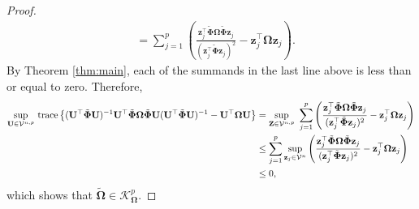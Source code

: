 \documentclass[12pt]{article}
\newcommand{\tr}{\text{\rm trace}}
\newcommand{\bl}[1]{{\mathbf #1}}
\newcommand{\bs}[1]{\boldsymbol #1}
\begin{document}
\begin{proof}
\begin{equation*}
\begin{aligned}
    &= \sum_{j=1}^p \left( \frac{\bl{z}_j^\top \tilde{\bs{\Phi}} \bs{\Omega} \tilde{\bs{\Phi}}\bl{z}_j}{(\bl{z}_j^\top \tilde{\bs{\Phi}} \bl{z}_j)^2} - \bl{z}_j^\top \bs{\Omega} \bl{z}_j \right).
\end{aligned}
\end{equation*}
By Theorem \ref{thm:main}, each of the summands in the last line above is less than or equal to zero. Therefore,
\begin{equation*}
\begin{aligned}
    \underset{\bl{U} \in \mathcal{V}^{n,p}}{\sup}~\tr \left\{(\bl{U}^\top \tilde{\bs{\Phi}} \bl{U})^{-1} \bl{U}^\top \tilde{\bs{\Phi}} \bs{\Omega} \tilde{\bs{\Phi}} \bl{U} (\bl{U}^\top \tilde{\bs{\Phi}} \bl{U})^{-1} - \bl{U}^\top \bs{\Omega} \bl{U} \right\} &= \underset{\bl{Z} \in \mathcal{V}^{n,p}}{\sup}~\sum_{j=1}^p \left( \frac{\bl{z}_j^\top \tilde{\bs{\Phi}} \bs{\Omega} \tilde{\bs{\Phi}}\bl{z}_j}{(\bl{z}_j^\top \tilde{\bs{\Phi}} \bl{z}_j)^2} - \bl{z}_j^\top \bs{\Omega} \bl{z}_j \right) \\
    &\leq \sum_{j=1}^p \underset{\bl{z}_j \in \mathcal{V}^{n}}{\sup}\left( \frac{\bl{z}_j^\top \tilde{\bs{\Phi}} \bs{\Omega} \tilde{\bs{\Phi}}\bl{z}_j}{(\bl{z}_j^\top \tilde{\bs{\Phi}} \bl{z}_j)^2} - \bl{z}_j^\top \bs{\Omega} \bl{z}_j \right) \\
    &\leq 0,
\end{aligned}    
\end{equation*}
which shows that $\tilde{\bs{\Omega}} \in \mathcal{K}_{\bs{\Omega}}^p$.


\end{proof}
\end{document}
